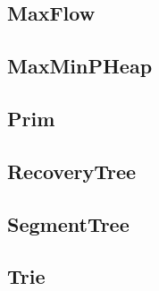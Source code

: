 \subsection{ MaxFlow}
\raggedbottom
\hrulefill
\subsection{ MaxMinPHeap}
\raggedbottom
\hrulefill
\subsection{ Prim}
\raggedbottom
\hrulefill
\subsection{ RecoveryTree}
\raggedbottom
\hrulefill
\subsection{ SegmentTree}
\raggedbottom
\hrulefill
\subsection{ Trie}
\raggedbottom
\hrulefill

